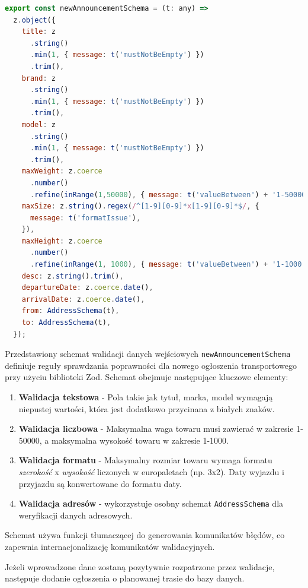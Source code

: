 {\belowcaptionskip=-9pt
\begin{lstlisting}[language=JavaScript,caption=Schemat walidacji danych wejściowych, label=lst:addAnnouncementSchema]
export const newAnnouncementSchema = (t: any) =>
  z.object({
    title: z
      .string()
      .min(1, { message: t('mustNotBeEmpty') })
      .trim(),
    brand: z
      .string()
      .min(1, { message: t('mustNotBeEmpty') })
      .trim(),
    model: z
      .string()
      .min(1, { message: t('mustNotBeEmpty') })
      .trim(),
    maxWeight: z.coerce
      .number()
      .refine(inRange(1,50000), { message: t('valueBetween') + '1-50000' }),
    maxSize: z.string().regex(/^[1-9][0-9]*x[1-9][0-9]*$/, {
      message: t('formatIssue'),
    }),
    maxHeight: z.coerce
      .number()
      .refine(inRange(1, 1000), { message: t('valueBetween') + '1-1000' }),
    desc: z.string().trim(),
    departureDate: z.coerce.date(),
    arrivalDate: z.coerce.date(),
    from: AddressSchema(t),
    to: AddressSchema(t),
  });
\end{lstlisting}
}

Przedstawiony schemat walidacji danych wejściowych \texttt{newAnnouncementSchema} definiuje reguły sprawdzania poprawności dla nowego ogłoszenia transportowego przy użyciu biblioteki Zod. Schemat obejmuje następujące kluczowe elementy:
\begin{enumerate}
    \item \textbf{Walidacja tekstowa} - Pola takie jak tytuł, marka, model wymagają niepustej wartości, która jest dodatkowo przycinana z białych znaków.
    \item \textbf{Walidacja liczbowa} - Maksymalna waga towaru musi zawierać w zakresie 1-50000, a maksymalna wysokość towaru w zakresie 1-1000.
    \item \textbf{Walidacja formatu} - Maksymalny rozmiar towaru wymaga formatu \emph{szerokość} x \emph{wysokość} liczonych w europaletach (np. 3x2). Daty wyjazdu i przyjazdu są konwertowane do formatu daty.
    \item \textbf{Walidacja adresów} - wykorzystuje osobny schemat \texttt{AddressSchema} dla weryfikacji danych adresowych.
\end{enumerate}
Schemat używa funkcji tłumaczącej do generowania komunikatów błędów, co zapewnia internacjonalizację komunikatów walidacyjnych.

Jeżeli wprowadzone dane zostaną pozytywnie rozpatrzone przez walidacje, następuje dodanie ogłoszenia o planowanej trasie do bazy danych.

